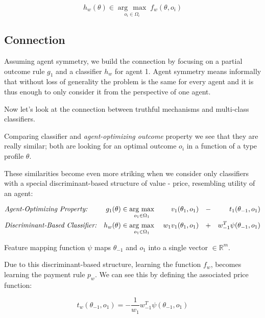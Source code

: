 \documentclass[]{article}
\newcommand{\argmax}[1]{\underset{#1}{\operatorname{arg}\,\operatorname{max}}\;}
\begin{document}
\begin{equation*}
h_{w}(\theta) \in \argmax{o_{i} \in \Omega_{i}} f_{w}(\theta,o_{i})
\end{equation*}

\subsection{Connection}
Assuming agent symmetry, we build the connection by focusing on a partial outcome rule $g_{1}$ and a classifier $h_{w}$ for agent 1. Agent symmetry means informally that without loss of generality the problem is the same for every agent and it is thus enough to only consider it from the perspective of one agent.

\noindent Now let's look at the connection between truthful mechanisms and multi-class classifiers. 


\noindent Comparing classifier and \emph{agent-optimizing outcome} property we see that they are really similar;
both are looking for an optimal outcome $o_{i}$ in a function of a type profile $\theta$.

\noindent These similarities become even more striking when we consider only classifiers with a special discriminant-based structure of value - price, resembling utility of an agent:

\small
\begin{equation*}
\begin{aligned}
& \text{\emph{Agent-Optimizing Property:}} & g_{1}(\theta) \in \argmax{o_{1} \in \Omega_{1}} & & v_{1}(\theta_{1}, o_{1}) & & - && t_{1}(\theta_{-1}, o_{1})\\
& \text{\emph{Discriminant-Based Classifier:}} & h_{w}(\theta) \in \argmax{o_{1} \in \Omega_{1}} &  & w_{1}v_{1}(\theta_{1}, o_{1})& & + && w_{-1}^{T}\psi(\theta_{-1}, o_{1})  \\
\end{aligned}
\end{equation*}
\normalsize

\noindent Feature mapping function $\psi$ maps $\theta_{-1}$ and $o_{1}$ into a single vector $\in \mathbb{R}^{m}$.


\noindent Due to this discriminant-based structure, learning the function $f_{w}$, becomes learning the payment rule $p_{w}$. We can see this by defining the associated price function:


\begin{equation*}
 t_{w}(\theta_{-1}, o_{1}) = - \frac{1}{w_{1}} w_{-1}^T \psi(\theta_{-1},o_{1})
\end{equation*}
\end{document}
